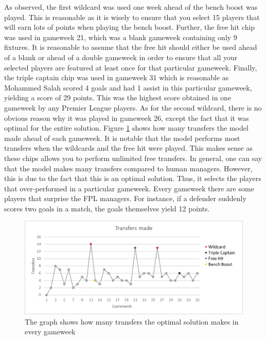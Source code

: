  As observed, the first wildcard was used one week ahead of the bench boost was played. This is reasonable as it is wisely to ensure that you select 15 players that will earn lots of points when playing the bench boost. Further, the free hit chip was used in gameweek 21, which was a blank gameweek containing only 9 fixtures. It is reasonable to assume that the free hit should either be used ahead of a blank or ahead of a double gameweek in order to ensure that all your selected players are featured at least once for that particular gameweek. Finally, the triple captain chip was used in gameweek 31 which is reasonable as Mohammed Salah scored 4 goals and had 1 assist in this particular gameweek, yielding a score of 29 points. This was the highest score obtained in one gameweek by any Premier League players. As for the second wildcard, there is no obvious reason why it was played in gameweek 26, except the fact that it was optimal for the entire solution. 
\newpar
Figure \ref{Figure_Transfers} shows how many transfers the model made ahead of each gameweek. It is notable that the model performs most transfers when the wildcards and the free hit were played. This makes sense as these chips allows you to perform unlimited free transfers. In general, one can say that the model makes many transfers compared to human managers. However, this is due to the fact that this is an optimal solution. Thus, it selects the players that over-performed in a particular gameweek. Every gameweek there are some players that surprise the FPL managers. For instance, if a defender suddenly scores two goals in a match, the goals themselves yield 12 points. 

\begin{figure}[H]
\label{fig_Transfers}
    \centering
    \includegraphics[scale=0.75]{fig/chapter_7/Transfers_colour.png}
    \caption{The graph shows how many transfers the optimal solution makes in every gameweek}
\label{Figure_Transfers}    
\end{figure}


